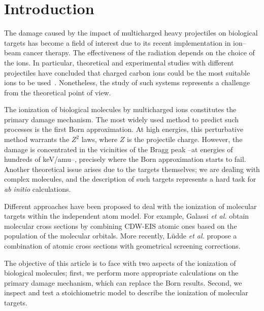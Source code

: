 \documentclass[10pt,showpacs,showkeys,twocolumn]{revtex4}
\begin{document}
\maketitle

\section{Introduction}

The damage caused by the impact of multicharged heavy projectiles on 
biological targets has become a field of interest due to its recent 
implementation in ion--beam cancer therapy. The effectiveness of the 
radiation depends on the choice of the ions. In particular, theoretical 
and experimental studies with different projectiles have concluded that 
charged carbon ions could be the most suitable ions to be used~\cite{Mohamad2017}. 
Nonetheless, the study of such systems represents a challenge from the 
theoretical point of view. 

The ionization of biological molecules by multicharged ions constitutes 
the primary damage mechanism. The most widely used method to predict
such processes is the first Born approximation. At high energies, this 
perturbative method warrants the $Z^{2}$ laws, where $Z$ is the 
projectile charge. However, the damage is concentrated in the 
vicinities of the Bragg peak --at energies of hundreds of keV/amu--, 
precisely where the Born approximation starts to fail. 
Another theoretical issue arises due to the targets themselves; we are 
dealing with complex molecules, and the description of such targets 
represents a hard task for {\it ab initio} calculations. 

Different approaches have been proposed to deal with the ionization of 
molecular targets within the independent atom model. For example, 
Galassi \textit{et al.} \cite{galassi2000} obtain molecular cross 
sections by combining CDW-EIS atomic ones based on the population of 
the molecular orbitals. More recently, L\"udde \textit{et al.} 
\cite{ludde2016,ludde2018} 
propose a combination of atomic cross sections with geometrical screening
corrections.

The objective of this article is to face with two aspects of the ionization
of biological molecules; first, we perform 
more appropriate calculations on the primary damage mechanism, which can 
replace the Born results. Second, we inspect and test a stoichiometric 
model to describe the ionization of molecular targets.
\end{document}
